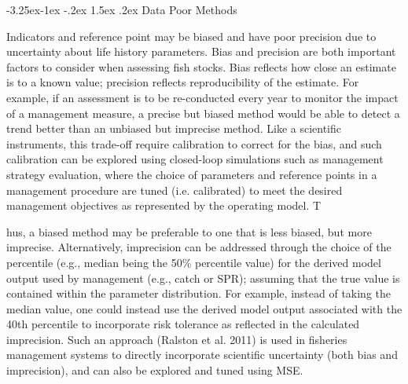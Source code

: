 \documentclass[a4paper, 10pt]{article}
\makeatletter
\renewcommand{\subsection}{\@startsection{subsection}{2}{\z@}%
  {-3.25ex\@plus -1ex \@minus -.2ex}%
  {1.5ex \@plus .2ex}%
  {\normalfont\bfseries\slshape}}
\makeatother
\begin{document}
\subsection{Data Poor Methods}

Indicators and reference point may be biased and have poor precision due to uncertainty about life history parameters. Bias and precision are both important factors to consider when assessing fish stocks. Bias reflects how close an estimate is to a known value; precision reflects reproducibility of the estimate. For example, if an assessment is to be re-conducted every year to monitor the impact of a management measure, a precise but biased method would be able to detect a trend better than an unbiased but imprecise method. Like a scientific instruments, this trade-off require calibration to correct for the bias, and such calibration can be explored using closed-loop simulations such as management strategy evaluation, where the choice of parameters and reference points in a management procedure are tuned (i.e. calibrated) to meet the desired management objectives as represented by the operating model. T

hus, a biased method may be preferable to one that is less biased, but more imprecise. Alternatively, imprecision can be addressed through the choice of the percentile (e.g., median being the 50\% percentile value) for the derived model output used by management (e.g., catch or SPR); assuming that the true value is contained within the parameter distribution. For example, instead of taking the median value, one could instead use the derived model output associated with the 40th percentile to incorporate risk tolerance as reflected in the calculated imprecision. Such an approach (Ralston et al. 2011) is used in fisheries management systems to directly incorporate scientific uncertainty (both bias and imprecision), and can also be explored and tuned using MSE. 
\end{document}
